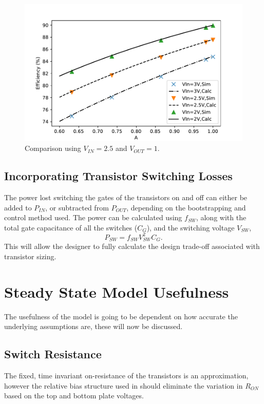 \documentclass[conference]{IEEEtran}
\begin{document}
 	\begin{figure}
 		\centering
 		\includegraphics[width=\linewidth]{Figures/eta_A.pdf}
 		\caption{Comparison using $V_{IN} = 2.5$ and $V_{OUT} = 1$.}
 		\label{fig:Comp_A}
 	\end{figure}
 	\subsection{Incorporating Transistor Switching Losses}
 	The power lost switching the gates of the transistors on and off can either be added to $P_{IN}$, or subtracted from $P_{OUT}$, depending on the bootstrapping and control method used. The power can be calculated using $f_{SW}$, along with the total gate capacitance of all the switches ($C_{G}$), and the switching voltage $V_{SW}$,
 	\begin{equation}
 	P_{SW} = f_{SW}V_{SW}^2C_G.
 	\end{equation}
 	This will allow the designer to fully calculate the design trade-off associated with transistor sizing. 
 	
 	
 	\section{Steady State Model Usefulness}
 	The usefulness of the model is going to be dependent on how accurate the underlying assumptions are, these will now be discussed. 
 	\subsection{Switch Resistance}
 	The fixed, time invariant on-resistance of the transistors is an approximation, however the relative bias structure used in \cite{Butzen2019} should eliminate the variation in $R_{ON}$ based on the top and bottom plate voltages.
 	
\end{document}
